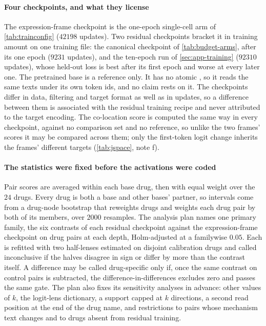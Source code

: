 \paragraph{Four checkpoints, and what they license} The
expression-frame checkpoint is the one-epoch single-cell arm of
\cref{tab:trainconfig} ($\num{42198}$ updates). Two residual checkpoints bracket
it in training amount on one training file: the canonical  checkpoint of \cref{tab:budget-arms}, after its one epoch
($\num{9231}$ updates), and the ten-epoch run of \cref{sec:app-training}
($\num{92310}$ updates), whose held-out loss is best after its first epoch and
worse at every later one. The pretrained base is a reference only. It has no atomic
\ENDCELL{}, so it reads the same texts under its own token ids, and no claim
rests on it. The checkpoints differ in data, filtering and target format as well
as in updates, so a difference between them is associated with the residual
training recipe and never attributed to the target encoding. The co-location
score is computed the same way in every checkpoint, against no comparison set
and no reference, so unlike the two frames' scores it may be compared across
them; only the first-token logit change inherits the frames' different targets
(\cref{tab:jspace}, note f).

\paragraph{The statistics were fixed before the activations were coded} Pair
scores are averaged within each base drug, then with equal weight over the $24$
drugs. Every drug is both a base and other bases' partner, so intervals come
from a drug-node bootstrap that reweights drugs and weights each drug pair by
both of its members, over $\num{2000}$ resamples. The analysis plan names one
primary family, the six contrasts of each residual checkpoint against the
expression-frame checkpoint on drug pairs at each depth, Holm-adjusted at a
familywise $0.05$. Each is refitted with two half-lenses estimated on disjoint
calibration drugs and called inconclusive if the halves disagree in sign or
differ by more than the contrast itself. A difference may be called
drug-specific only if, once the same contrast on control pairs is subtracted,
the difference-in-differences excludes zero and passes the same gate. The plan
also fixes its sensitivity analyses in advance: other values of $k$, the
logit-lens dictionary, a support capped at $k$ directions, a second read
position at the end of the drug name, and restrictions to pairs whose mechanism
text changes and to drugs absent from residual training.

